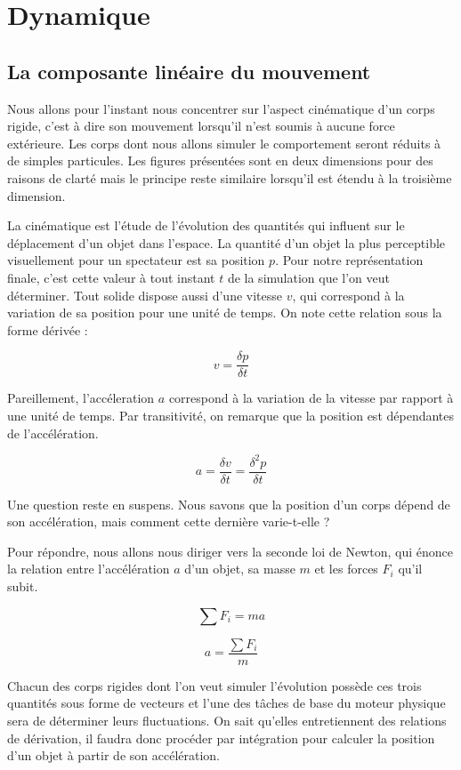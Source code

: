 \section{Dynamique} 

\subsection{La composante linéaire du mouvement}

Nous allons pour l'instant nous concentrer sur l'aspect cinématique d'un corps rigide, c'est à dire son mouvement lorsqu'il n'est soumis à aucune force extérieure. Les corps dont nous allons simuler le comportement seront réduits à de simples particules. Les figures présentées sont en deux dimensions pour des raisons de clarté mais le principe reste similaire lorsqu'il est étendu à la troisième dimension.

La cinématique est l'étude de l'évolution des quantités qui influent sur le déplacement d'un objet dans l'espace. La quantité d'un objet la plus perceptible visuellement pour un spectateur est sa position $p$. Pour notre représentation finale, c'est cette valeur à tout instant $t$ de la simulation que l'on veut déterminer. Tout solide dispose aussi d'une vitesse $v$, qui correspond à la variation de sa position pour une unité de temps. On note cette relation sous la forme dérivée :

\[v = \frac{\delta p}{\delta t}\]

Pareillement, l'accéleration $a$ correspond à la variation de la vitesse par rapport à une unité de temps. Par transitivité, on remarque que la position est dépendantes de l'accélération.

\[a = \frac{\delta v}{\delta t} = \frac{\delta^2 p}{\delta t}\]

Une question reste en suspens. Nous savons que la position d'un corps dépend de son accélération, mais comment cette dernière varie-t-elle ?

Pour répondre, nous allons nous diriger vers la seconde loi de Newton, qui énonce la relation entre l'accélération $a$ d'un objet, sa masse $m$ et les forces $F_i$ qu'il subit.

\[\sum F_i = m a\]

\[a = \frac{\sum F_i}{m}\]

Chacun des corps rigides dont l'on veut simuler l'évolution possède ces trois quantités sous forme de vecteurs et l'une des tâches de base du moteur physique sera de déterminer leurs fluctuations. On sait qu'elles entretiennent des relations de dérivation, il faudra donc procéder par intégration pour calculer la position d'un objet à partir de son accélération.

